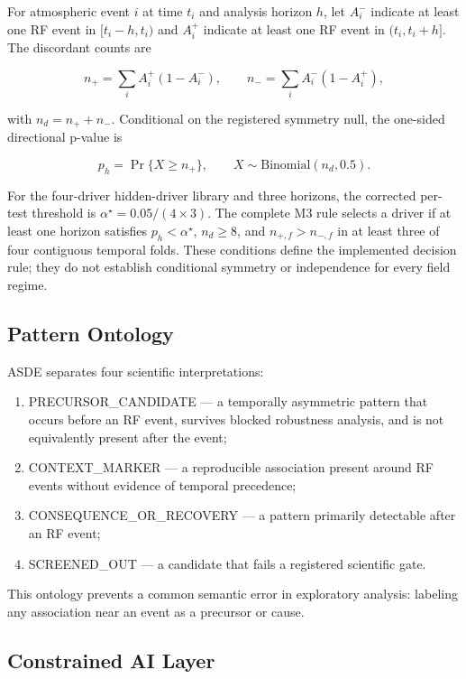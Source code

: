 \documentclass{ieeeaccess}
\providecommand{\tightlist}{\setlength{\itemsep}{0pt}\setlength{\parskip}{0pt}}
\begin{document}
For atmospheric event \(i\) at time \(t_i\) and analysis horizon \(h\), let \(A_i^-\) indicate at least one RF event in \([t_i-h,t_i)\) and \(A_i^+\) indicate at least one RF event in \((t_i,t_i+h]\). The discordant counts are

\[
n_{+}=\sum_i A_i^+(1-A_i^-), \qquad
n_{-}=\sum_i A_i^-(1-A_i^+),
\]

with \(n_d=n_{+}+n_{-}\). Conditional on the registered symmetry null, the one-sided directional p-value is

\[
p_h=\Pr\{X\ge n_{+}\}, \qquad X\sim\mathrm{Binomial}(n_d,0.5).
\]

For the four-driver hidden-driver library and three horizons, the corrected per-test threshold is \(\alpha^\star=0.05/(4\times3)\). The complete M3 rule selects a driver if at least one horizon satisfies \(p_h<\alpha^\star\), \(n_d\ge8\), and \(n_{+,f}>n_{-,f}\) in at least three of four contiguous temporal folds. These conditions define the implemented decision rule; they do not establish conditional symmetry or independence for every field regime.

\subsection{Pattern Ontology}\label{pattern-ontology}

ASDE separates four scientific interpretations:

\begin{enumerate}
\def\labelenumi{\arabic{enumi}.}
\tightlist
\item
  PRECURSOR\_CANDIDATE --- a temporally asymmetric pattern that occurs before an RF event, survives blocked robustness analysis, and is not equivalently present after the event;
\item
  CONTEXT\_MARKER --- a reproducible association present around RF events without evidence of temporal precedence;
\item
  CONSEQUENCE\_OR\_RECOVERY --- a pattern primarily detectable after an RF event;
\item
  SCREENED\_OUT --- a candidate that fails a registered scientific gate.
\end{enumerate}

This ontology prevents a common semantic error in exploratory analysis: labeling any association near an event as a precursor or cause.

\subsection{Constrained AI Layer}\label{constrained-ai-layer}
\end{document}
